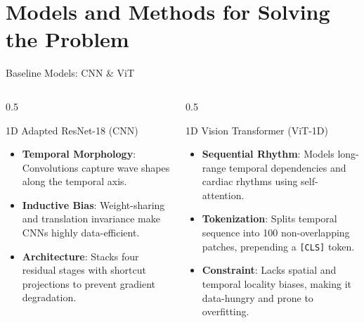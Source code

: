 \documentclass[11pt,aspectratio=169]{beamer}
\begin{document}
\section{Models and Methods for Solving the Problem}
\begin{frame}{Baseline Models: CNN \& ViT}
    \begin{columns}[T]
        \begin{column}{0.5\textwidth}
            \begin{block}{1D Adapted ResNet-18 (CNN)}
                \begin{itemize}
                    \item \textbf{Temporal Morphology}: Convolutions capture wave shapes along the temporal axis.
                    \item \textbf{Inductive Bias}: Weight-sharing and translation invariance make CNNs highly data-efficient.
                    \item \textbf{Architecture}: Stacks four residual stages with shortcut projections to prevent gradient degradation.
                \end{itemize}
            \end{block}
        \end{column}
        \begin{column}{0.5\textwidth}
            \begin{block}{1D Vision Transformer (ViT-1D)}
                \begin{itemize}
                    \item \textbf{Sequential Rhythm}: Models long-range temporal dependencies and cardiac rhythms using self-attention.
                    \item \textbf{Tokenization}: Splits temporal sequence into 100 non-overlapping patches, prepending a \texttt{[CLS]} token.
                    \item \textbf{Constraint}: Lacks spatial and temporal locality biases, making it data-hungry and prone to overfitting.
                \end{itemize}
            \end{block}
        \end{column}
    \end{columns}
\end{frame}
\end{document}
